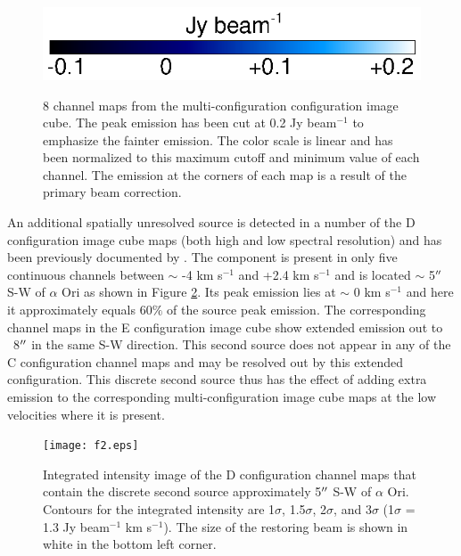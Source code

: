 \documentclass[apj]{emulateapj}
\begin{document}
\begin{figure}[hbt!]
{         }
\includegraphics[trim=0pt 20pt 195pt 10pt]{color_bar.ps}
\caption{8 channel maps from the multi-configuration configuration image cube. The peak emission has been cut at 0.2 Jy beam${{}^{-1}}$ to emphasize the fainter emission. The color scale is linear and has been normalized to this maximum cutoff and minimum value of each channel. The emission at the corners of each map is a result of the primary beam correction.}
\label{fig:fig3}
\end{figure}

An additional spatially unresolved source is detected in a number of the D configuration image cube maps (both high and low spectral resolution) and has been previously documented by \citet{2009AIPC.1094..868H}. The component is present in only five continuous channels between $\sim$ -4 km s${}^{-1}$ and +2.4 km s${}^{-1}$ and is located $\sim$ 5$\mbox{$^{\prime\prime}$}$ S-W of $\alpha$ Ori as shown in Figure \ref{fig:fig2}. Its peak emission lies at $\sim$ 0 km s${}^{-1}$ and here it approximately equals 60$\%$ of the source peak emission. The corresponding channel maps in the E configuration image cube show extended emission out to ~8$\mbox{$^{\prime\prime}$}$ in the same S-W direction. This second source does not appear in any of the C configuration channel maps and may be resolved out by this extended configuration. This discrete second source thus has the effect of adding extra emission to the corresponding multi-configuration image cube maps at the low velocities where it is present.

\begin{figure}
\texttt{[image: f2.eps]}
\caption{Integrated intensity image of the D configuration channel maps that contain the discrete second source approximately 5$\mbox{$^{\prime\prime}$}$ S-W of $\alpha$ Ori. Contours for the integrated intensity are 1$\sigma$, 1.5$\sigma$, 2$\sigma$, and 3$\sigma$ (1$\sigma$ = 1.3 Jy beam${}^{-1}$ km s${}^{-1}$). The size of the restoring beam is shown in white in the bottom left corner.}
\label{fig:fig2}
\end{figure}
\end{document}
